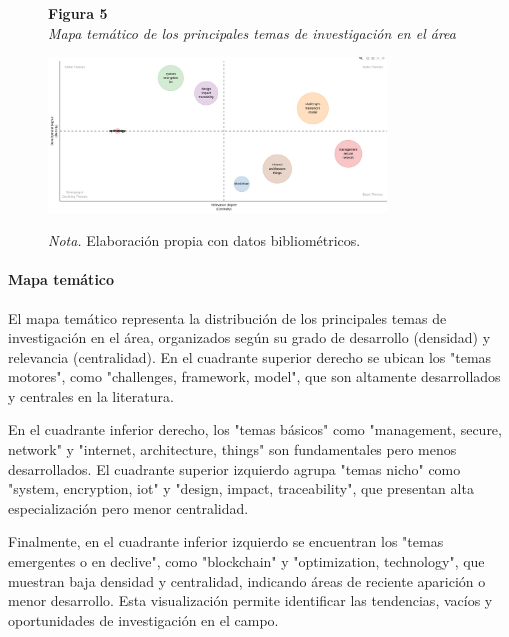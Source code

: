 \begin{figure}[htbp]
    \begin{flushleft}
        \textbf{Figura 5}\\[2em]
        \textit{Mapa temático de los principales temas de investigación en el área}
    \end{flushleft}
    \vspace{1em}
    \centering
    \includegraphics[width=0.8\textwidth]{Images/MapaTematico.jpeg}
    \vspace{2em}
    \begin{flushleft}
        \textit{Nota.} Elaboración propia con datos bibliométricos.
    \end{flushleft}
    \label{fig:mapa_tematico}
\end{figure}

\paragraph{Mapa temático}
El mapa temático representa la distribución de los principales temas de investigación en el área, organizados según su grado de desarrollo (densidad) y relevancia (centralidad). En el cuadrante superior derecho se ubican los "temas motores", como "challenges, framework, model", que son altamente desarrollados y centrales en la literatura.

En el cuadrante inferior derecho, los "temas básicos" como "management, secure, network" y "internet, architecture, things" son fundamentales pero menos desarrollados. El cuadrante superior izquierdo agrupa "temas nicho" como "system, encryption, iot" y "design, impact, traceability", que presentan alta especialización pero menor centralidad.

Finalmente, en el cuadrante inferior izquierdo se encuentran los "temas emergentes o en declive", como "blockchain" y "optimization, technology", que muestran baja densidad y centralidad, indicando áreas de reciente aparición o menor desarrollo. Esta visualización permite identificar las tendencias, vacíos y oportunidades de investigación en el campo.


